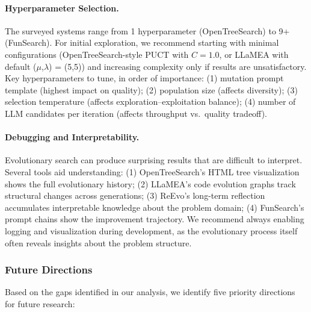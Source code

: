 \paragraph{Hyperparameter Selection.}
The surveyed systems range from 1 hyperparameter (OpenTreeSearch) to 9+ (FunSearch). For initial exploration, we recommend starting with minimal configurations (OpenTreeSearch-style PUCT with $C=1.0$, or LLaMEA with default ($\mu$,$\lambda$) = (5,5)) and increasing complexity only if results are unsatisfactory. Key hyperparameters to tune, in order of importance: (1) mutation prompt template (highest impact on quality); (2) population size (affects diversity); (3) selection temperature (affects exploration--exploitation balance); (4) number of LLM candidates per iteration (affects throughput vs.\ quality tradeoff).

\paragraph{Debugging and Interpretability.}
Evolutionary search can produce surprising results that are difficult to interpret. Several tools aid understanding: (1) OpenTreeSearch's HTML tree visualization shows the full evolutionary history; (2) LLaMEA's code evolution graphs track structural changes across generations; (3) ReEvo's long-term reflection accumulates interpretable knowledge about the problem domain; (4) FunSearch's prompt chains show the improvement trajectory. We recommend always enabling logging and visualization during development, as the evolutionary process itself often reveals insights about the problem structure.


\subsubsection{Future Directions}

Based on the gaps identified in our analysis, we identify five priority directions for future research:

